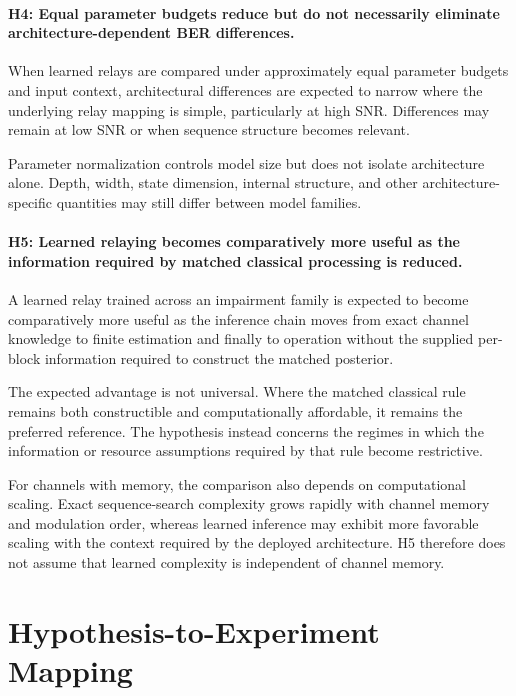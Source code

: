 \paragraph{H4: Equal parameter budgets reduce but do not necessarily
eliminate architecture-dependent BER differences.}

When learned relays are compared under approximately equal parameter budgets
and input context, architectural differences are expected to narrow where the
underlying relay mapping is simple, particularly at high SNR. Differences may
remain at low SNR or when sequence structure becomes relevant.

Parameter normalization controls model size but does not isolate architecture
alone. Depth, width, state dimension, internal structure, and other
architecture-specific quantities may still differ between model families.


\paragraph{H5: Learned relaying becomes comparatively more useful as the
information required by matched classical processing is reduced.}

A learned relay trained across an impairment family is expected to become
comparatively more useful as the inference chain moves from exact channel
knowledge to finite estimation and finally to operation without the supplied
per-block information required to construct the matched posterior.

The expected advantage is not universal. Where the matched classical rule
remains both constructible and computationally affordable, it remains the
preferred reference. The hypothesis instead concerns the regimes in which the
information or resource assumptions required by that rule become restrictive.

For channels with memory, the comparison also depends on computational
scaling. Exact sequence-search complexity grows rapidly with channel memory
and modulation order, whereas learned inference may exhibit more favorable
scaling with the context required by the deployed architecture. H5 therefore
does not assume that learned complexity is independent of channel memory.


\section{Hypothesis-to-Experiment Mapping}
\label{sec:hypothesis-experiment-map}

